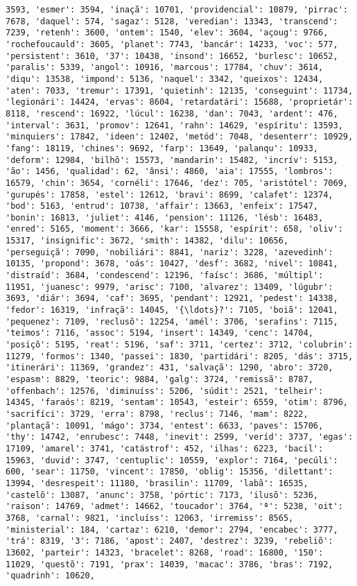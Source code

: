 \begin{Verbatim}[commandchars=\\\{\}]
3593, 'esmer': 3594, 'inaçã': 10701, 'providencial': 10879, 'pirrac': 7678, 'daquel': 574, 'sagaz': 5128, 'veredian': 13343, 'transcend': 7239, 'retenh': 3600, 'ontem': 1540, 'elev': 3604, 'açoug': 9766, 'rochefoucauld': 3605, 'planet': 7743, 'bancár': 14233, 'voc': 577, 'persistent': 3610, '37': 10438, 'insond': 16652, 'burlesc': 10652, 'paralis': 5339, 'angol': 10916, 'marcous': 17784, 'chuv': 3614, 'diqu': 13538, 'impond': 5136, 'naquel': 3342, 'queixos': 12434, 'aten': 7033, 'tremur': 17391, 'quietinh': 12135, 'conseguint': 11734, 'legionári': 14424, 'ervas': 8604, 'retardatári': 15688, 'proprietár': 8118, 'rescend': 16922, 'lúcul': 16238, 'dan': 7043, 'ardent': 476, 'interval': 3631, 'promov': 12641, 'rahn': 14629, 'espíritu': 13593, 'minquiers': 17842, 'ideen': 12402, 'metód': 7048, 'desenterr': 10929, 'fang': 18119, 'chines': 9692, 'farp': 13649, 'palanqu': 10933, 'deform': 12984, 'bilhõ': 15573, 'mandarin': 15482, 'incrív': 5153, 'ão': 1456, 'qualidad': 62, 'ânsi': 4860, 'aia': 17555, 'lombros': 16579, 'chin': 3654, 'cornéli': 17646, 'dez': 705, 'aristótel': 7069, 'gurupés': 17858, 'estel': 12612, 'bravi': 8699, 'calafet': 12374, 'bod': 5163, 'entrud': 10738, 'affair': 13663, 'enfeix': 17547, 'bonin': 16813, 'juliet': 4146, 'pension': 11126, 'lésb': 16483, 'enred': 5165, 'moment': 3666, 'kar': 15558, 'espírit': 658, 'oliv': 15317, 'insignific': 3672, 'smith': 14382, 'dilu': 10656, 'perseguiçã': 7090, 'nobiliári': 8841, 'nariz': 3228, 'azevedinh': 10135, 'propond': 3678, 'oás': 10427, 'desf': 3682, 'nivel': 10841, 'distraíd': 3684, 'condescend': 12196, 'faísc': 3686, 'múltipl': 11951, 'juanesc': 9979, 'arisc': 7100, 'alvarez': 13409, 'lúgubr': 3693, 'diár': 3694, 'caf': 3695, 'pendant': 12921, 'pedest': 14338, 'fedor': 16319, 'infraçã': 14045, '{\ldots}?': 7105, 'boiã': 12041, 'pequenez': 7109, 'reclusõ': 12254, 'amél': 3706, 'serafins': 7115, 'teimos': 7116, 'assoc': 5194, 'insert': 14349, 'cenc': 14704, 'posiçõ': 5195, 'reat': 5196, 'saf': 3711, 'certez': 3712, 'colubrin': 11279, 'formos': 1340, 'passei': 1830, 'partidári': 8205, 'dás': 3715, 'itinerári': 11369, 'grandez': 431, 'salvaçã': 1290, 'abro': 3720, 'espasm': 8829, 'teoric': 9884, 'galg': 3724, 'remissã': 8787, 'offenbach': 12576, 'diminuíss': 5206, 'súdit': 2521, 'telheir': 14345, 'faraós': 8219, 'sentam': 10543, 'esteir': 6559, 'otim': 8796, 'sacrifíci': 3729, 'erra': 8798, 'reclus': 7146, 'mam': 8222, 'plantaçã': 10091, 'mágo': 3734, 'entest': 6633, 'paves': 15706, 'thy': 14742, 'enrubesc': 7448, 'inevit': 2599, 'veríd': 3737, 'egas': 17109, 'amarel': 3741, 'catástrof': 452, 'ilhas': 6223, 'bacil': 15963, 'duvid': 3747, 'centuplic': 10559, 'explor': 7164, 'pecúli': 600, 'sear': 11750, 'vincent': 17850, 'oblig': 15356, 'dilettant': 13994, 'desrespeit': 11180, 'brasilin': 11709, 'labã': 16535, 'castelõ': 13087, 'anunc': 3758, 'pórtic': 7173, 'ilusõ': 5236, 'raison': 14769, 'admet': 14662, 'toucador': 3764, 'ª': 5238, 'oit': 3768, 'carnal': 9821, 'incluíss': 12063, 'irremiss': 8565, 'ministerial': 184, 'cartaz': 6210, 'demor': 2794, 'encabec': 3777, 'trá': 8319, '3': 7186, 'apost': 2407, 'destrez': 3239, 'rebeliõ': 13602, 'parteir': 14323, 'bracelet': 8268, 'road': 16800, '150': 11029, 'questõ': 7191, 'prax': 14039, 'macac': 3786, 'bras': 7192, 'quadrinh': 10620, 
\end{Verbatim}
